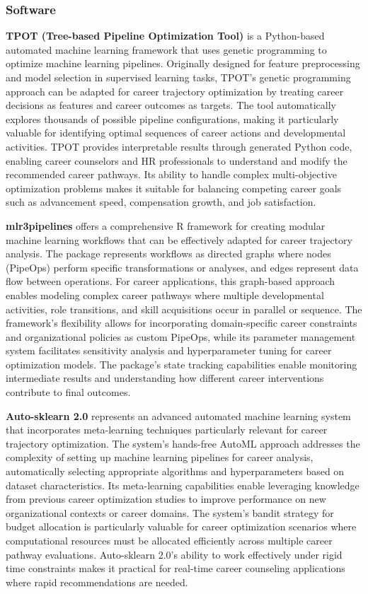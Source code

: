 \documentclass[main.tex]{subfiles}
\begin{document}
\subsubsection{Software}

\textbf{TPOT (Tree-based Pipeline Optimization Tool)} is a Python-based automated machine learning framework that uses genetic programming to optimize machine learning pipelines\parencite{tpot,tpot_kdnuggets}. Originally designed for feature preprocessing and model selection in supervised learning tasks, TPOT's genetic programming approach can be adapted for career trajectory optimization by treating career decisions as features and career outcomes as targets. The tool automatically explores thousands of possible pipeline configurations, making it particularly valuable for identifying optimal sequences of career actions and developmental activities. TPOT provides interpretable results through generated Python code, enabling career counselors and HR professionals to understand and modify the recommended career pathways. Its ability to handle complex multi-objective optimization problems makes it suitable for balancing competing career goals such as advancement speed, compensation growth, and job satisfaction.

\textbf{mlr3pipelines} offers a comprehensive R framework for creating modular machine learning workflows that can be effectively adapted for career trajectory analysis\parencite{mlr3pipelines}. The package represents workflows as directed graphs where nodes (PipeOps) perform specific transformations or analyses, and edges represent data flow between operations. For career applications, this graph-based approach enables modeling complex career pathways where multiple developmental activities, role transitions, and skill acquisitions occur in parallel or sequence. The framework's flexibility allows for incorporating domain-specific career constraints and organizational policies as custom PipeOps, while its parameter management system facilitates sensitivity analysis and hyperparameter tuning for career optimization models. The package's state tracking capabilities enable monitoring intermediate results and understanding how different career interventions contribute to final outcomes.

\textbf{Auto-sklearn 2.0} represents an advanced automated machine learning system that incorporates meta-learning techniques particularly relevant for career trajectory optimization\parencite{autosklearn}. The system's hands-free AutoML approach addresses the complexity of setting up machine learning pipelines for career analysis, automatically selecting appropriate algorithms and hyperparameters based on dataset characteristics. Its meta-learning capabilities enable leveraging knowledge from previous career optimization studies to improve performance on new organizational contexts or career domains. The system's bandit strategy for budget allocation is particularly valuable for career optimization scenarios where computational resources must be allocated efficiently across multiple career pathway evaluations. Auto-sklearn 2.0's ability to work effectively under rigid time constraints makes it practical for real-time career counseling applications where rapid recommendations are needed.
\end{document}
